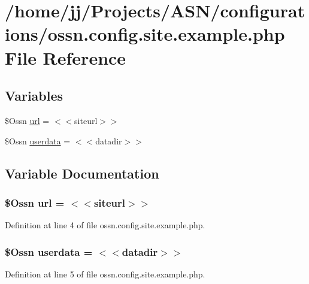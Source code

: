 \hypertarget{ossn_8config_8site_8example_8php}{}\section{/home/jj/\+Projects/\+A\+S\+N/configurations/ossn.config.\+site.\+example.\+php File Reference}
\label{ossn_8config_8site_8example_8php}
\subsection*{Variables}
\begin{DoxyCompactItemize}
\item 
\$Ossn \hyperlink{ossn_8config_8site_8example_8php_ad643c3db2725019ef8130393d549e6db}{url} = \textquotesingle{}$<$$<$siteurl$>$$>$\textquotesingle{}
\item 
\$Ossn \hyperlink{ossn_8config_8site_8example_8php_a62e5ff89c18396576aabeaad2764e459}{userdata} = \textquotesingle{}$<$$<$datadir$>$$>$\textquotesingle{}
\end{DoxyCompactItemize}


\subsection{Variable Documentation}
\subsubsection[{\texorpdfstring{url}{url}}]{\setlength{\rightskip}{0pt plus 5cm}\$Ossn url = \textquotesingle{}$<$$<$siteurl$>$$>$\textquotesingle{}}\hypertarget{ossn_8config_8site_8example_8php_ad643c3db2725019ef8130393d549e6db}{}\label{ossn_8config_8site_8example_8php_ad643c3db2725019ef8130393d549e6db}


Definition at line 4 of file ossn.\+config.\+site.\+example.\+php.

\subsubsection[{\texorpdfstring{userdata}{userdata}}]{\setlength{\rightskip}{0pt plus 5cm}\$Ossn userdata = \textquotesingle{}$<$$<$datadir$>$$>$\textquotesingle{}}\hypertarget{ossn_8config_8site_8example_8php_a62e5ff89c18396576aabeaad2764e459}{}\label{ossn_8config_8site_8example_8php_a62e5ff89c18396576aabeaad2764e459}


Definition at line 5 of file ossn.\+config.\+site.\+example.\+php.

